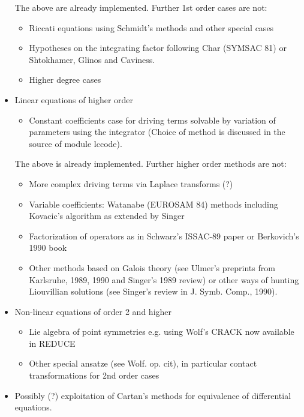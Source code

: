 \begin{itemize}
The above are already implemented. Further 1st order cases are not:
\begin{itemize}
\item Riccati equations using Schmidt's methods and other special cases
\item Hypotheses on the integrating factor following Char (SYMSAC 81)
or Shtokhamer, Glinos and Caviness.
\item Higher degree cases
\end{itemize}
\item Linear equations of higher order
\begin{itemize}
\item Constant coefficients case for driving terms solvable by
variation of parameters using the integrator
(Choice of method is discussed in the source of module lccode).
\end{itemize}
The above is already implemented. Further higher order methods are not:
\begin{itemize}
\item More complex driving terms via Laplace transforms (?)
\item  Variable coefficients: Watanabe (EUROSAM 84) methods
including Kovacic's algorithm as extended by Singer
\item  Factorization of operators as in Schwarz's ISSAC-89 paper or
Berkovich's 1990 book
\item  Other methods based on Galois theory (see Ulmer's preprints
from Karlsruhe, 1989, 1990 and Singer's 1989 review) or
other ways of hunting Liouvillian solutions (see Singer's
review in J. Symb. Comp., 1990).
\end{itemize}
\item Non-linear equations of order 2 and higher
\begin{itemize}
\item Lie algebra of point symmetries e.g. using Wolf's CRACK now available
in REDUCE
\item  Other special ansatze (see Wolf. op. cit), in particular
contact transformations for 2nd order cases
\end{itemize}
\item Possibly (?) exploitation of Cartan's methods for equivalence of
differential equations.
\end{itemize}

